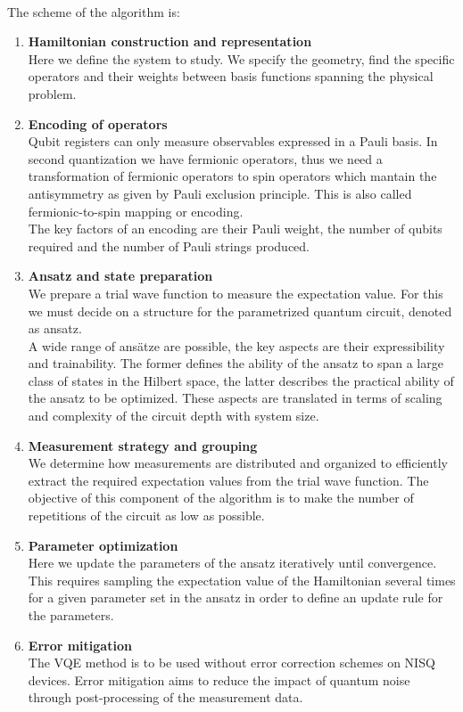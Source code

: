 \\
The scheme of the algorithm is:
\begin{enumerate}
    \item \textbf{Hamiltonian construction and representation} \\
    Here we define the system to study. We specify the geometry, find the specific operators and their weights between basis functions spanning the physical problem.
    
    \item \textbf{Encoding of operators} \\
    Qubit registers can only measure observables expressed in a Pauli basis. In second quantization we have fermionic operators, thus we need a transformation of fermionic operators to spin operators which mantain the antisymmetry as given by Pauli exclusion principle. This is also called fermionic-to-spin mapping or encoding. \\
    The key factors of an encoding are their Pauli weight, the number of qubits required and the number of Pauli strings produced.
    
    \item \textbf{Ansatz and state preparation} \\
    We prepare a trial wave function to measure the expectation value. For this we must decide on a structure for the parametrized quantum circuit, denoted as ansatz. \\
    A wide range of ansätze are possible, the key aspects are their expressibility and trainability. The former defines the ability of the ansatz to span a large class of states in the Hilbert space, the latter describes the practical ability of the ansatz to be optimized. These aspects are translated in terms of scaling and complexity of the circuit depth with system size.
    
    \item \textbf{Measurement strategy and grouping} \\
    We determine how measurements are distributed and organized to efficiently extract the required expectation values from the trial wave function. The objective of this component of the algorithm is to make the number of repetitions of the circuit as low as possible.
    
    \item \textbf{Parameter optimization} \\
    Here we update the parameters of the ansatz iteratively until convergence. This requires sampling the expectation value of the Hamiltonian several times for a given parameter set in the ansatz in order to define an update rule for the parameters.
    
    \item \textbf{Error mitigation} \\
    The VQE method is to be used without error correction schemes on NISQ devices. Error mitigation aims to reduce the impact of quantum noise through post-processing of the measurement data.
\end{enumerate}
